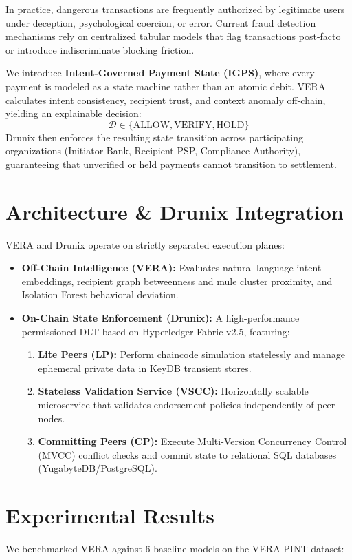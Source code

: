 \documentclass[10pt,conference]{IEEEtran}
\begin{document}
In practice, dangerous transactions are frequently authorized by legitimate users under deception, psychological coercion, or error. Current fraud detection mechanisms rely on centralized tabular models that flag transactions post-facto or introduce indiscriminate blocking friction.

We introduce \textbf{Intent-Governed Payment State (IGPS)}, where every payment is modeled as a state machine rather than an atomic debit. VERA calculates intent consistency, recipient trust, and context anomaly off-chain, yielding an explainable decision:
\begin{equation}
\mathcal{D} \in \{\text{ALLOW}, \text{VERIFY}, \text{HOLD}\}
\end{equation}
Drunix then enforces the resulting state transition across participating organizations (Initiator Bank, Recipient PSP, Compliance Authority), guaranteeing that unverified or held payments cannot transition to settlement.

\section{Architecture \& Drunix Integration}
VERA and Drunix operate on strictly separated execution planes:
\begin{itemize}
    \item \textbf{Off-Chain Intelligence (VERA):} Evaluates natural language intent embeddings, recipient graph betweenness and mule cluster proximity, and Isolation Forest behavioral deviation.
    \item \textbf{On-Chain State Enforcement (Drunix):} A high-performance permissioned DLT based on Hyperledger Fabric v2.5, featuring:
    \begin{enumerate}
        \item \textbf{Lite Peers (LP):} Perform chaincode simulation statelessly and manage ephemeral private data in KeyDB transient stores.
        \item \textbf{Stateless Validation Service (VSCC):} Horizontally scalable microservice that validates endorsement policies independently of peer nodes.
        \item \textbf{Committing Peers (CP):} Execute Multi-Version Concurrency Control (MVCC) conflict checks and commit state to relational SQL databases (YugabyteDB/PostgreSQL).
    \end{enumerate}
\end{itemize}

\section{Experimental Results}
We benchmarked VERA against 6 baseline models on the VERA-PINT dataset:
\end{document}
